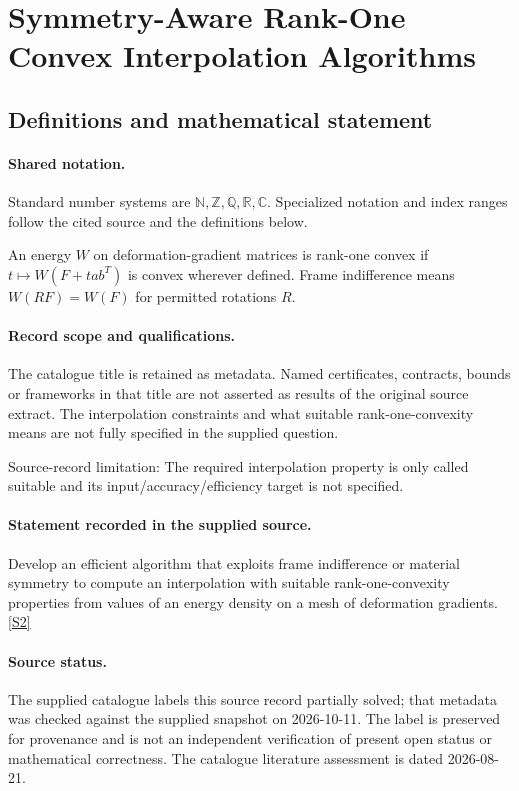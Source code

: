 \documentclass[11pt]{article}
\newcommand{\sref}[2]{\hyperlink{source:#1:#2}{[S#2]}}
\begin{document}
\section{Symmetry-Aware Rank-One Convex Interpolation Algorithms}\label{statement}

\subsection{Definitions and mathematical statement}

\paragraph{Shared notation.}Standard number systems are $\mathbb N,\mathbb Z,\mathbb Q,\mathbb R,\mathbb C$. Specialized notation and index ranges follow the cited source and the definitions below.


An energy $W$ on deformation-gradient matrices is rank-one convex if $t\mapsto W(F+t ab^T)$ is convex wherever defined. Frame indifference means $W(RF)=W(F)$ for permitted rotations $R$.
\paragraph{Record scope and qualifications.}
The catalogue title is retained as metadata. Named certificates, contracts, bounds or frameworks in that title are not asserted as results of the original source extract.
The interpolation constraints and what suitable rank-one-convexity means are not fully specified in the supplied question.

Source-record limitation: The required interpolation property is only called suitable and its input/accuracy/efficiency target is not specified.
\paragraph{Statement recorded in the supplied source.}
Develop an efficient algorithm that exploits frame indifference or material symmetry to compute an interpolation with suitable rank-one-convexity properties from values of an energy density on a mesh of deformation gradients. \sref{statement}{2}
\paragraph{Source status.}
The supplied catalogue labels this source record partially solved; that metadata was checked against the supplied snapshot on 2026-10-11. The label is preserved for provenance and is not an independent verification of present open status or mathematical correctness. The catalogue literature assessment is dated 2026-08-21.
\end{document}
